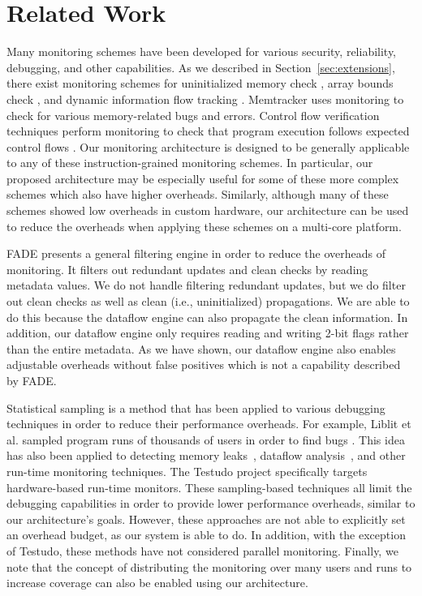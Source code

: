 \section{Related Work}
\label{sec:related}

Many monitoring schemes have been developed for various security, reliability,
debugging, and other capabilities.  As we described in
Section~\ref{sec:extensions}, there exist monitoring schemes for uninitialized
memory check \cite{mondrian-asplos02}, array bounds check
\cite{hardbound-asplos08, clause-ase07}, and dynamic information flow
tracking \cite{dift-asplos04, raksha-isca07, loki-osdi08}.
Memtracker \cite{memtracker-hpca07} uses monitoring to check for various
memory-related bugs and errors.  Control flow verification techniques perform
monitoring to check that program execution follows expected control flows
\cite{schuette-comp87, impres-dac06,
kayaalp-isca12}.  Our monitoring architecture is designed to
be generally applicable to any of these instruction-grained monitoring schemes.
In particular, our proposed architecture may be especially useful for some of
these more complex schemes which also have higher overheads.  Similarly,
although many of these schemes showed low overheads in custom hardware, our
architecture can be used to reduce the overheads when applying these schemes on
a multi-core platform.
 
FADE \cite{fade-hpca14} presents a general filtering engine in order to reduce
the overheads of monitoring. It filters out redundant updates and clean checks
by reading metadata values. We do not handle filtering redundant updates, but
we do filter out clean checks as well as clean (i.e., uninitialized)
propagations.  We are able to do this because the dataflow engine can also
propagate the clean information.  In addition, our dataflow engine only
requires reading and writing 2-bit flags rather than the entire metadata.  As
we have shown, our dataflow engine also enables adjustable overheads without
false positives which is not a capability described by FADE.

Statistical sampling is a method that has been applied to various debugging
techniques in order to reduce their performance overheads. For example, Liblit
et al. sampled program runs of thousands of users in order to find bugs
\cite{liblit-pldi05}. This idea has also been applied to detecting memory
leaks~\cite{chilimbi-asplos04}, dataflow analysis~\cite{greathouse-cgo11}, and
other run-time monitoring techniques. The Testudo project
\cite{testudo-micro08} specifically targets hardware-based run-time monitors.
These sampling-based techniques all limit the debugging capabilities in order
to provide lower performance overheads, similar to our architecture's goals.
However, these approaches are not able to explicitly set an overhead budget, as
our system is able to do. In addition, with the exception of Testudo, these
methods have not considered parallel monitoring. Finally, we note that the
concept of distributing the monitoring over many users and runs to increase
coverage can also be enabled using our architecture.

